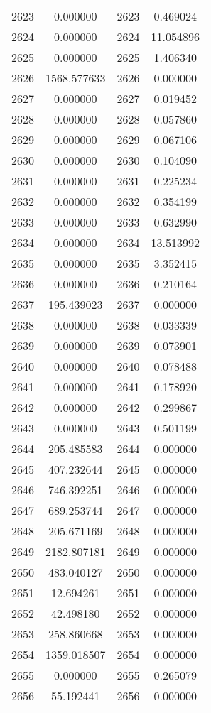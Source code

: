 \documentclass[12pt]{article}
\begin{document}
\begin{longtable}{@{}cccc@{}}
2623 & 0.000000 & 2623 & 0.469024 \\
2624 & 0.000000 & 2624 & 11.054896 \\
2625 & 0.000000 & 2625 & 1.406340 \\
2626 & 1568.577633 & 2626 & 0.000000 \\
2627 & 0.000000 & 2627 & 0.019452 \\
2628 & 0.000000 & 2628 & 0.057860 \\
2629 & 0.000000 & 2629 & 0.067106 \\
2630 & 0.000000 & 2630 & 0.104090 \\
2631 & 0.000000 & 2631 & 0.225234 \\
2632 & 0.000000 & 2632 & 0.354199 \\
2633 & 0.000000 & 2633 & 0.632990 \\
2634 & 0.000000 & 2634 & 13.513992 \\
2635 & 0.000000 & 2635 & 3.352415 \\
2636 & 0.000000 & 2636 & 0.210164 \\
2637 & 195.439023 & 2637 & 0.000000 \\
2638 & 0.000000 & 2638 & 0.033339 \\
2639 & 0.000000 & 2639 & 0.073901 \\
2640 & 0.000000 & 2640 & 0.078488 \\
2641 & 0.000000 & 2641 & 0.178920 \\
2642 & 0.000000 & 2642 & 0.299867 \\
2643 & 0.000000 & 2643 & 0.501199 \\
2644 & 205.485583 & 2644 & 0.000000 \\
2645 & 407.232644 & 2645 & 0.000000 \\
2646 & 746.392251 & 2646 & 0.000000 \\
2647 & 689.253744 & 2647 & 0.000000 \\
2648 & 205.671169 & 2648 & 0.000000 \\
2649 & 2182.807181 & 2649 & 0.000000 \\
2650 & 483.040127 & 2650 & 0.000000 \\
2651 & 12.694261 & 2651 & 0.000000 \\
2652 & 42.498180 & 2652 & 0.000000 \\
2653 & 258.860668 & 2653 & 0.000000 \\
2654 & 1359.018507 & 2654 & 0.000000 \\
2655 & 0.000000 & 2655 & 0.265079 \\
2656 & 55.192441 & 2656 & 0.000000 \\

\end{longtable}
\end{document}
